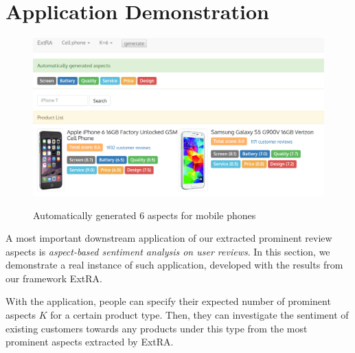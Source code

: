 \section{Application Demonstration}
\label{sec:demo}
\begin{figure}[]
	\centering
	{\includegraphics[width=1.5\columnwidth]{figures/sentimentcompare.png}}\vfill 
	\caption{Automatically generated 6 aspects for mobile phones\label{fig:experiments:sentimentcompare}}
\end{figure}
A most important downstream application of our extracted prominent review aspects is \textit{aspect-based sentiment analysis on user reviews}.
In this section,
we demonstrate a real instance of such application, developed with the results from our framework ExtRA.

With the application, people can specify their expected number of prominent aspects $K$ for a certain product type.
Then, they can investigate the sentiment of existing customers towards any products under this type from the most prominent aspects extracted by ExtRA.

